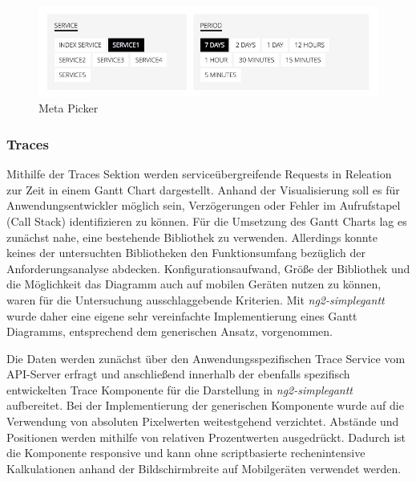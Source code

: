 


\begin{figure}[hptb]
 \centering
 \includegraphics[width=\linewidth]{kapitel4/metapicker.jpg}
 \caption{Meta Picker}
 \label{metapicker}
\end{figure}
\vspace{0.3cm}


\subsubsection{Traces}

Mithilfe der Traces Sektion werden serviceübergreifende Requests in Releation zur Zeit in einem Gantt Chart dargestellt.
Anhand der Visualisierung soll es für Anwendungsentwickler möglich sein, Verzögerungen oder Fehler im Aufrufstapel (Call Stack) identifizieren zu können.
Für die Umsetzung des Gantt Charts lag es zunächst nahe, eine bestehende Bibliothek zu verwenden.
Allerdings konnte keines der untersuchten Bibliotheken den Funktionsumfang bezüglich der Anforderungsanalyse abdecken.
Konfigurationsaufwand, Größe der Bibliothek und die Möglichkeit das Diagramm auch auf mobilen Geräten nutzen zu können, waren für die Untersuchung ausschlaggebende Kriterien.
Mit \emph{ng2-simplegantt} wurde daher eine eigene sehr vereinfachte Implementierung eines Gantt Diagramms, entsprechend dem generischen Ansatz, vorgenommen.

Die Daten werden zunächst über den Anwendungsspezifischen Trace Service vom API-Server erfragt und anschließend innerhalb der ebenfalls spezifisch entwickelten Trace Komponente
für die Darstellung in \emph{ng2-simplegantt} aufbereitet.
Bei der Implementierung der generischen Komponente wurde auf die Verwendung von absoluten Pixelwerten weitestgehend verzichtet.
Abstände und Positionen werden mithilfe von relativen Prozentwerten ausgedrückt. Dadurch ist die Komponente responsive und kann
ohne scriptbasierte rechenintensive Kalkulationen anhand der Bildschirmbreite auf Mobilgeräten verwendet werden.


